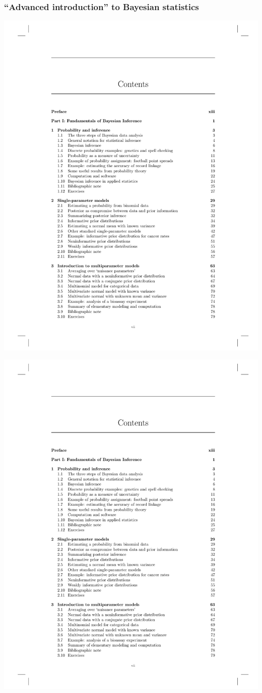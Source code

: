 \documentclass[18pt]{beamer}
\begin{document}
\begin{frame}
\frametitle{``Advanced introduction'' to Bayesian statistics}

{\centering

\includegraphics[width=.7\linewidth]{Figure/bda_toc_head}

\vspace*{-.8\baselineskip}
\scalebox{.5}{$\vdots$}
\vspace*{-.2\baselineskip}

\includegraphics[width=.7\linewidth]{Figure/bda_toc_middle_1}

}
\end{frame}
\end{document}
